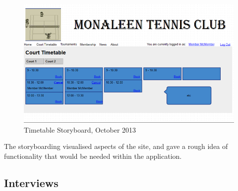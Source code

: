 \begin{figure}[H]
\begin{center}
\includegraphics[width=14cm]{storyboard.png}
\end{center}
\caption{Timetable Storyboard, October 2013}
\label{fig:timetableSB}
\end{figure}

The storyboarding visualised aspects of the site, and gave a rough idea of functionality that would be needed within the application. 

\subsection{Interviews}



